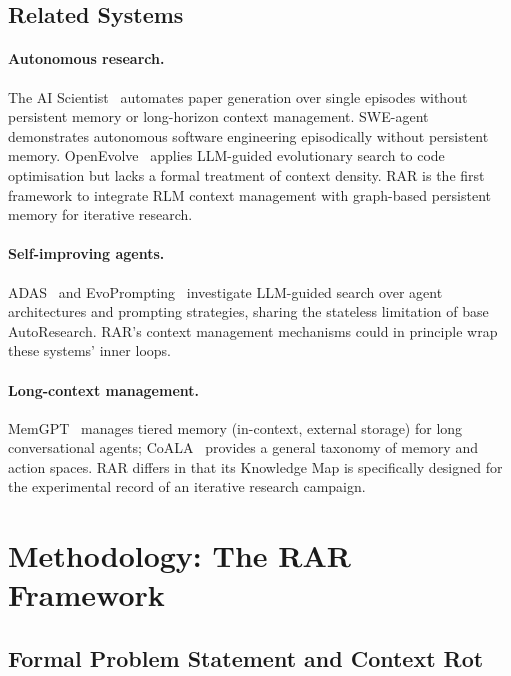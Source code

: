 \documentclass[conference]{IEEEtran}
\begin{document}
\subsection{Related Systems}

\paragraph{Autonomous research.}
The AI Scientist~\citep{lu2024aiscientist} automates paper generation over single episodes without persistent memory or long-horizon context management. SWE-agent~\citep{yang2024sweagent} demonstrates autonomous software engineering episodically without persistent memory. OpenEvolve~\citep{novack2025openevolve} applies LLM-guided evolutionary search to code optimisation but lacks a formal treatment of context density. RAR is the first framework to integrate RLM context management with graph-based persistent memory for iterative research.

\paragraph{Self-improving agents.}
ADAS~\citep{hu2024adas} and EvoPrompting~\citep{chen2023evoprompting} investigate LLM-guided search over agent architectures and prompting strategies, sharing the stateless limitation of base AutoResearch. RAR's context management mechanisms could in principle wrap these systems' inner loops.

\paragraph{Long-context management.}
MemGPT~\citep{packer2023memgpt} manages tiered memory (in-context, external storage) for long conversational agents; CoALA~\citep{sumers2023coala} provides a general taxonomy of memory and action spaces. RAR differs in that its Knowledge Map is specifically designed for the experimental record of an iterative research campaign.

\section{Methodology: The RAR Framework}

\subsection{Formal Problem Statement and Context Rot}
\label{sec:formulation}
\end{document}
